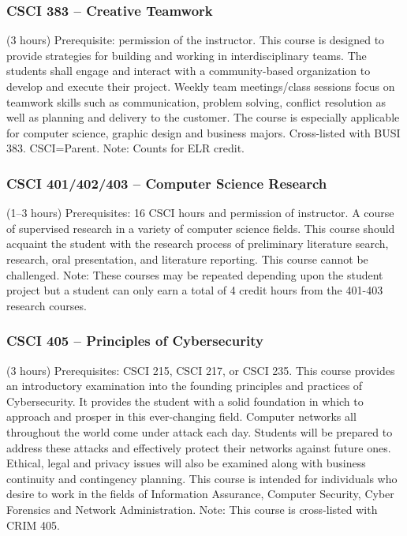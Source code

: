 \subsubsection{CSCI 383 -- Creative Teamwork}
(3 hours) Prerequisite: permission of the instructor. This course is designed to provide strategies for building and working in interdisciplinary teams. The students shall engage and interact with a community-based organization to develop and execute their project. Weekly team meetings/class sessions focus on teamwork skills such as communication, problem solving, conflict resolution as well as planning and delivery to the customer. The course is especially applicable for computer science, graphic design and business majors. Cross-listed with BUSI 383. CSCI=Parent. Note: Counts for ELR credit.

\subsubsection{CSCI 401/402/403 -- Computer Science Research}
(1--3 hours) Prerequisites: 16 CSCI hours and permission of instructor. A course of supervised research in a variety of computer science fields. This course should acquaint the student with the research process of preliminary literature search, research, oral presentation, and literature reporting. This course cannot be challenged. Note: These courses may be repeated depending upon the student project but a student can only earn a total of 4 credit hours from the 401-403 research courses.

\subsubsection{CSCI 405 -- Principles of Cybersecurity}
(3 hours) Prerequisites: CSCI 215, CSCI 217, or CSCI 235. This course provides an introductory examination into the founding principles and practices of Cybersecurity.  It provides the student with a solid foundation in which to approach and prosper in this ever-changing field.  Computer networks all throughout the world come under attack each day.  Students will be prepared to address these attacks and effectively protect their networks against future ones.  Ethical, legal and privacy issues will also be examined along with business continuity and contingency planning.  This course is intended for individuals who desire to work in the fields of Information Assurance, Computer Security, Cyber Forensics and Network Administration. Note: This course is cross-listed with CRIM 405.

